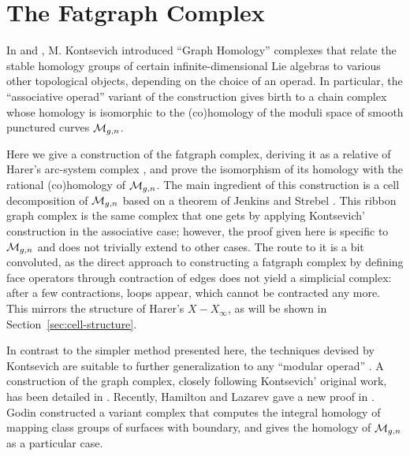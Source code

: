 

\chapter{The Fatgraph Complex}
\label{cha:ribbon-graph-complex}

In \cite{kontsevich;1993} and \cite{kontsevich;feynman}, M. Kontsevich
introduced ``Graph Homology'' complexes that relate the stable
homology groups of certain infinite-dimensional Lie algebras to
various other topological objects, depending on the choice of an
operad.  In particular, the ``associative operad'' variant of the
construction gives birth to a chain complex whose homology is
isomorphic to the (co)homology of the moduli space of smooth punctured
curves $\mathcal{M}_{g,n}$.

Here we give a construction of the fatgraph complex, deriving it as a
relative of Harer's arc-system complex \cite{%
  harer;cohomological-dimension,%
  harer;cohomology-of-moduli%
}, and prove the isomorphism of its homology with the rational
(co)homology of $\mathcal{M}_{g,n}$.  The main ingredient of this construction
is a cell decomposition of $\mathcal{M}_{g,n}$ based on a theorem of Jenkins
and Strebel \cite{strebel;quadratic-differentials;1983}.  This ribbon
graph complex is the same complex that one gets by applying
Kontsevich' construction in the associative case; however, the proof
given here is specific to $\mathcal{M}_{g,n}$ and does not trivially extend to
other cases.  The route to it is a bit convoluted, as the direct
approach to constructing a fatgraph complex by defining face operators
through contraction of edges does not yield a simplicial complex:
after a few contractions, loops appear, which cannot be contracted any
more.  This mirrors the structure of Harer's $X - X_\infty$, as will
be shown in Section~\ref{sec:cell-structure}.

In contrast to the simpler method presented here, the techniques
devised by Kontsevich are suitable to further generalization to any
``modular operad'' \cite{getzler-kapranov}.  A construction of the
graph complex, closely following Kontsevich' original work, has been
detailed in \cite{conant-vogtmann;2003}. Recently, Hamilton and
Lazarev gave a new proof in \cite{hamilton-lazarev;math.QA/0608395}.
Godin \cite{godin:homology} constructed a variant complex that
computes the integral homology of mapping class groups of surfaces
with boundary, and gives the homology of $\mathcal{M}_{g,n}$ as a particular case.




